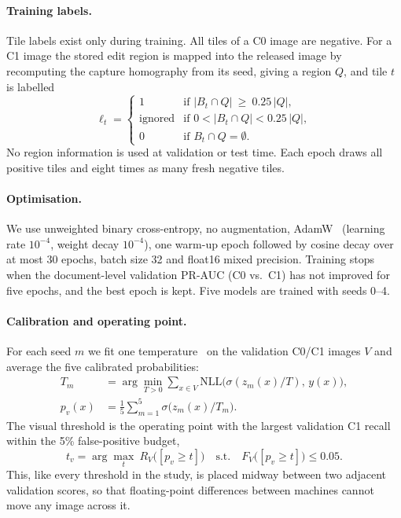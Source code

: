 \documentclass[12pt]{article}
\begin{document}
\paragraph*{Training labels.} Tile labels exist only during training.
All tiles of a C0 image are negative. For a C1 image the stored edit
region is mapped into the released image by recomputing the capture
homography from its seed, giving a region $Q$, and tile $t$ is labelled
\begin{equation}
\label{eq:tilelabel}
\ell_t=\begin{cases}
1 & \text{if } |B_t\cap Q|\ \ge\ 0.25\,|Q|,\\
\text{ignored} & \text{if } 0<|B_t\cap Q|<0.25\,|Q|,\\
0 & \text{if } B_t\cap Q=\emptyset .
\end{cases}
\end{equation}
No region information is used at validation or test time.
Each epoch draws all positive tiles and eight times as many fresh
negative tiles.

\paragraph*{Optimisation.} We use unweighted binary cross-entropy, no
augmentation, AdamW~\cite{adamw} (learning rate $10^{-4}$, weight decay
$10^{-4}$), one warm-up epoch followed by cosine decay over at most 30
epochs, batch size 32 and float16 mixed precision. Training stops when
the document-level validation PR-AUC (C0 vs.\ C1) has not improved for
five epochs, and the best epoch is kept. Five models are trained with
seeds 0--4.

\paragraph*{Calibration and operating point.} For each seed $m$ we fit
one temperature~\cite{guo} on the validation C0/C1 images $V$ and
average the five calibrated probabilities:
\begin{equation}
\label{eq:calib}
\begin{aligned}
T_m&=\arg\min_{T>0}\sum_{x\in V}\mathrm{NLL}\big(\sigma(z_m(x)/T),\,y(x)\big),\\
p_v(x)&=\frac{1}{5}\sum_{m=1}^{5}\sigma\big(z_m(x)/T_m\big).
\end{aligned}
\end{equation}
The visual threshold is the operating point with the largest validation
C1 recall within the 5\% false-positive budget,
\begin{equation}
\label{eq:threshold}
t_v=\arg\max_{t}\ R_{V}\big([p_v\ge t]\big)
\quad\text{s.t.}\quad F_{V}\big([p_v\ge t]\big)\le 0.05 .
\end{equation}
This, like every threshold in the study, is placed midway between two
adjacent validation scores, so that floating-point differences between
machines cannot move any image across it.
\end{document}
